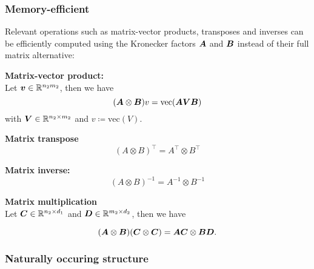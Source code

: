 \subsubsection{Memory-efficient}
Relevant operations such as matrix-vector products, transposes and inverses can be efficiently computed using the Kronecker factors ${\bm{A}}$ and ${\bm{B}}$ instead of their full matrix alternative:

\textbf{Matrix-vector product: } \\
Let ${\bm{v}} \in \mathbb{R}^{n_2m_2}$, then we have
$$ ({\bm{A}} \otimes {\bm{B}}) v = \text{vec}({\bm{A}} {\bm{V}} {\bm{B}}) $$
with ${\bm{V}} \in \mathbb{R}^{n_2\times m_2}$ and $v \coloneqq \text{vec}(V)$. 

\textbf{Matrix transpose}
$$ (A \otimes B)^{\top} = A^{\top} \otimes B^{\top} $$

\textbf{Matrix inverse: }
$$ (A \otimes B)^{-1} = A^{-1} \otimes B^{-1} $$

\textbf{Matrix multiplication} \\
Let ${\bm{C}} \in \mathbb{R}^{n_2 \times d_1}$ and ${\bm{D}} \in \mathbb{R}^{m_2 \times d_2}$, then we have

$$ ({\bm{A}} \otimes {\bm{B}})({\bm{C}} \otimes {\bm{C}}) = {\bm{A}} {\bm{C}} \otimes {\bm{B}} {\bm{D}}. $$ 


\subsubsection{Naturally occuring structure}

